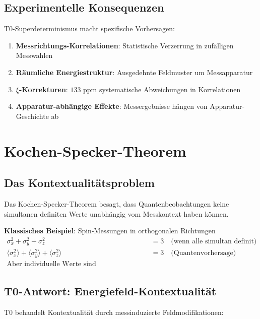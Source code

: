 \documentclass[12pt,a4paper]{article}
\newcommand{\xipar}{\xi}
\begin{document}
	\subsection{Experimentelle Konsequenzen}
	
	T0-Superdeterminismus macht spezifische Vorhersagen:
	
	\begin{enumerate}
		\item \textbf{Messrichtungs-Korrelationen}: Statistische Verzerrung in zufälligen Messwahlen
		\item \textbf{Räumliche Energiestruktur}: Ausgedehnte Feldmuster um Messapparatur
		\item \textbf{$\xipar$-Korrekturen}: $133$ ppm systematische Abweichungen in Korrelationen
		\item \textbf{Apparatur-abhängige Effekte}: Messergebnisse hängen von Apparatur-Geschichte ab
	\end{enumerate}
	
	\section{Kochen-Specker-Theorem}
	
	\subsection{Das Kontextualitätsproblem}
	
	Das Kochen-Specker-Theorem besagt, dass Quantenbeobachtungen keine simultanen definiten Werte unabhängig vom Messkontext haben können.
	
	\textbf{Klassisches Beispiel}: Spin-Messungen in orthogonalen Richtungen
	\begin{align}
		\sigma_x^2 + \sigma_y^2 + \sigma_z^2 &= 3 \quad \text{(wenn alle simultan definit)} \\
		\langle\sigma_x^2\rangle + \langle\sigma_y^2\rangle + \langle\sigma_z^2\rangle &= 3 \quad \text{(Quantenvorhersage)} \\
		\text{Aber individuelle Werte sind kontextabhängig!}
	\end{align}
	
	\subsection{T0-Antwort: Energiefeld-Kontextualität}
	
	T0 behandelt Kontextualität durch messinduzierte Feldmodifikationen:
	
\end{document}
